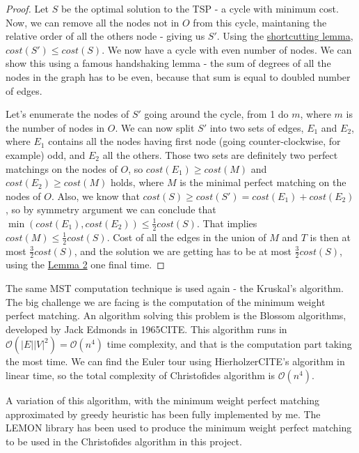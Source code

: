 \documentclass[12pt,twoside,notitlepage]{report}
\begin{document}
\begin{proof}

Let $S$ be the optimal solution to the TSP - a cycle with minimum cost. Now, we can remove all the nodes not in $O$ from this cycle, maintaning the relative order of all the others node - giving us $S'$. Using the \hyperref[shortcutting]{shortcutting lemma}, $cost(S') \leq cost(S)$. We now have a cycle with even number of nodes. We can show this using a famous handshaking lemma - the sum of degrees of all the nodes in the graph has to be even, because that sum is equal to doubled number of edges.

\small

Let's enumerate the nodes of $S'$ going around the cycle, from 1 do $m$, where $m$ is the number of nodes in $O$. We can now split $S'$ into two sets of edges, $E_1$ and $E_2$, where $E_1$ contains all the nodes having first node (going counter-clockwise, for example) odd, and $E_2$ all the others. Those two sets are definitely two perfect matchings on the nodes of $O$, so $cost(E_1) \geq cost(M)$ and $cost(E_2) \geq cost(M)$ holds, where $M$ is the minimal perfect matching on the nodes of $O$. Also, we know that $cost(S) \geq cost(S') = cost(E_1) + cost(E_2)$, so by symmetry argument we can conclude that $\min(cost(E_1), cost(E_2)) \leq \frac{1}{2}cost(S)$. That implies $cost(M) \leq \frac{1}{2}cost(S)$. Cost of all the edges in the union of $M$ and $T$ is then at most $\frac{3}{2} cost(S)$, and the solution we are getting has to be at most $\frac{3}{2} cost(S)$, using the \hyperref[shortcutting]{Lemma 2} one final time.

\end{proof}

The same MST computation technique is used again - the Kruskal's algorithm. The big challenge we are facing is the computation of the minimum weight perfect matching. An algorithm solving this problem is the Blossom algorithms, developed by Jack Edmonds in 1965CITE. This algorithm runs in $\mathcal{O}(|E||V|^2) = \mathcal{O}(n^4)$ time complexity, and that is the computation part taking the most time. We can find the Euler tour using HierholzerCITE's algorithm in linear time, so the total complexity of Christofides algorithm is $\mathcal{O}(n^4)$.

A variation of this algorithm, with the minimum weight perfect matching approximated by greedy heuristic has been fully implemented by me. The LEMON library has been used to produce the minimum weight perfect matching to be used in the Christofides algorithm in this project.
\end{document}
